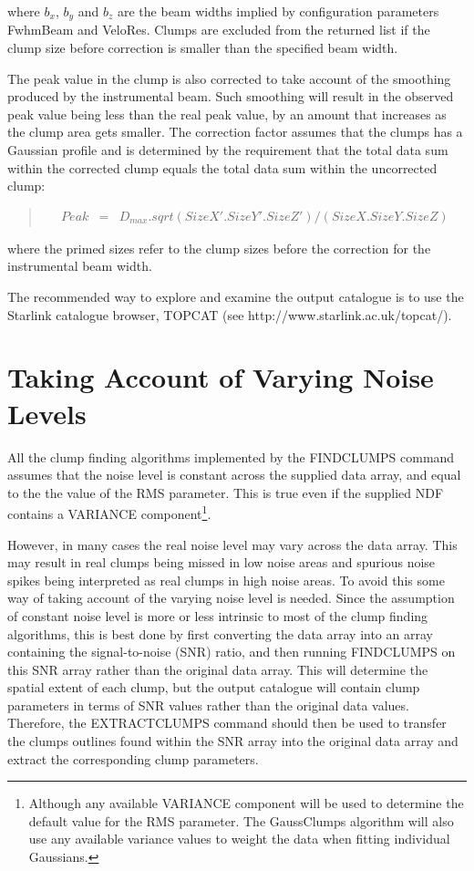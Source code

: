 \documentclass[twoside,11pt]{article}
\newcommand{\htmladdnormallink}[2]{#1}
\newcommand{\htmlref}[2]{#1}
\renewcommand{\_}{\texttt{\symbol{95}}}
\newenvironment{myquote}{\begin{quote}\begin{small}}{\end{small}\end{quote}}
\begin{document}
where $b_{x}$, $b_{y}$ and $b_{z}$ are the beam widths implied by
configuration parameters FwhmBeam and VeloRes. Clumps are excluded from
the returned list if the clump size before correction is smaller than the
specified beam width.

The peak value in the clump is also corrected to take account of the
smoothing produced by the instrumental beam. Such smoothing will result in
the observed peak value being less than the real peak value, by an amount
that increases as the clump area gets smaller. The correction factor
assumes that the clumps has a Gaussian profile and is determined by the
requirement that the total data sum within the corrected clump equals
the total data sum within the uncorrected clump:

\begin{myquote}
\begin{eqnarray*}
  Peak & = & D_{max}.sqrt{ (SizeX'.SizeY'.SizeZ')/(SizeX.SizeY.SizeZ)  } 
\end{eqnarray*}
\end{myquote}

where the primed sizes refer to the clump sizes before the correction for
the instrumental beam width.

The recommended way to explore and examine the output catalogue is to use
the Starlink catalogue browser, TOPCAT (see 
\htmladdnormallink{http://www.starlink.ac.uk/topcat/}
{http://www.starlink.ac.uk/topcat/}). 

\section{Taking Account of Varying Noise Levels}

All the clump finding algorithms implemented by the \htmlref{FINDCLUMPS}{FINDCLUMPS} 
command assumes that the noise level is constant across the supplied data
array, and equal to the the value of the RMS parameter. This is true even
if the supplied NDF contains a VARIANCE component\footnote{Although any
available VARIANCE component will be used to determine the default value
for the RMS parameter. The GaussClumps algorithm will also use any
available variance values to weight the data when fitting individual
Gaussians.}.

However, in many cases the real noise level may vary across the data
array. This may result in real clumps being missed in low noise areas and
spurious noise spikes being interpreted as real clumps in high noise
areas. To avoid this some way of taking account of the varying noise
level is needed. Since the assumption of constant noise level is more or
less intrinsic to most of the clump finding algorithms, this is best done
by first converting the data array into an array containing the
signal-to-noise (SNR) ratio, and then running FINDCLUMPS on this SNR array
rather than the original data array. This will determine the spatial
extent of each clump, but the output catalogue will contain clump
parameters in terms of SNR values rather than the original data values.
Therefore, the \htmlref{EXTRACTCLUMPS}{EXTRACTCLUMPS} command should then
be used to transfer the clumps outlines found within the SNR array into
the original data array and extract the corresponding clump parameters.
\end{document}
